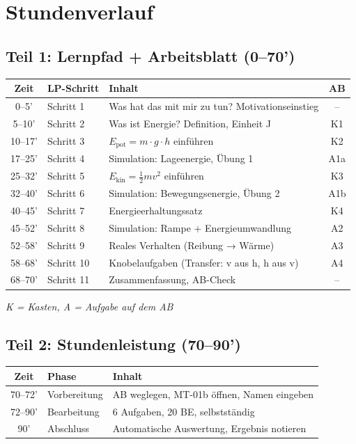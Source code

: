 \documentclass[11pt, a4paper]{article}
\begin{document}

\section*{Stundenverlauf}

\subsection*{Teil 1: Lernpfad + Arbeitsblatt (0–70')}

\begin{tabularx}{\textwidth}{@{}c|l|X|c@{}}
\toprule
\textbf{Zeit} & \textbf{LP-Schritt} & \textbf{Inhalt} & \textbf{AB} \\
\midrule
0–5' & Schritt 1 & Was hat das mit mir zu tun? Motivationseinstieg & – \\
5–10' & Schritt 2 & Was ist Energie? Definition, Einheit J & K1 \\
10–17' & Schritt 3 & $E_\text{pot} = m \cdot g \cdot h$ einführen & K2 \\
17–25' & Schritt 4 & Simulation: Lageenergie, Übung 1 & A1a \\
25–32' & Schritt 5 & $E_\text{kin} = \frac{1}{2} m v^2$ einführen & K3 \\
32–40' & Schritt 6 & Simulation: Bewegungsenergie, Übung 2 & A1b \\
40–45' & Schritt 7 & Energieerhaltungssatz & K4 \\
45–52' & Schritt 8 & Simulation: Rampe + Energieumwandlung & A2 \\
52–58' & Schritt 9 & Reales Verhalten (Reibung → Wärme) & A3 \\
58–68' & Schritt 10 & Knobelaufgaben (Transfer: v aus h, h aus v) & A4 \\
68–70' & Schritt 11 & Zusammenfassung, AB-Check & – \\
\bottomrule
\end{tabularx}

\vspace{0.5em}
\textit{K = Kasten, A = Aufgabe auf dem AB}

\subsection*{Teil 2: Stundenleistung (70–90')}

\begin{tabularx}{\textwidth}{@{}c|l|X@{}}
\toprule
\textbf{Zeit} & \textbf{Phase} & \textbf{Inhalt} \\
\midrule
70–72' & Vorbereitung & AB weglegen, MT-01b öffnen, Namen eingeben \\
72–90' & Bearbeitung & 6 Aufgaben, 20 BE, selbstständig \\
90' & Abschluss & Automatische Auswertung, Ergebnis notieren \\
\bottomrule
\end{tabularx}
\end{document}
